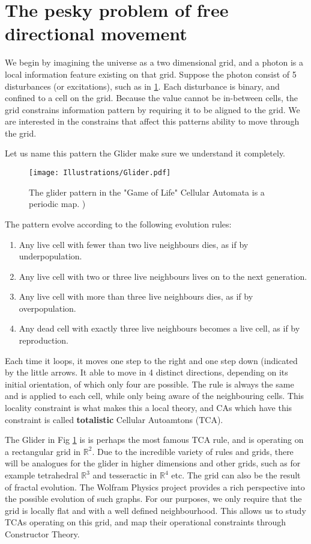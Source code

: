 \documentclass[notitlepage]{article}
\begin{document}
\section{The pesky problem of free directional movement}
We begin by imagining the universe as a two dimensional grid, and a photon is a local information feature existing on that grid. Suppose the photon consist of 5 disturbances (or excitations), such as in \ref{fig:glider}. Each disturbance is binary, and confined to a cell on the grid. Because the value cannot be in-between cells, the grid constrains information pattern by requiring it to be aligned to the grid. We are interested in the constrains that affect this patterns ability to move through the grid. 

Let us name this pattern the Glider make sure we understand it completely.

\begin{figure}[!ht]
  \centering
 \texttt{[image: Illustrations/Glider.pdf]}
  \caption{The glider pattern in the "Game of Life" Cellular Automata is a periodic map.  )  }
      \label{fig:glider}
\end{figure}

The pattern evolve according to the following evolution rules:

\begin{enumerate}
\item Any live cell with fewer than two live neighbours dies, as if by underpopulation.
\item Any live cell with two or three live neighbours lives on to the next generation.
\item Any live cell with more than three live neighbours dies, as if by overpopulation.
\item  Any dead cell with exactly three live neighbours becomes a live cell, as if by reproduction.
\end{enumerate}

Each time it loops, it moves one step to the right and one step down (indicated by the little arrows. It able to move in 4 distinct directions, depending on its initial orientation, of which only four are possible. The rule is always the same and is applied to each cell, while only being aware of the neighbouring cells. This locality constraint is what makes this a local theory, and CAs which have this constraint is called \textbf{totalistic} Cellular Autoamtons (TCA).

The Glider in Fig \ref{fig:glider} is is perhaps the most famous TCA rule, and is operating on a rectangular grid in $\mathbb{R}^2$. Due to the incredible variety of rules and grids, there will be analogues for the glider in higher dimensions and other grids, such as for example tetrahedral $\mathbb{R}^3$ and tesseractic in $\mathbb{R}^4$ etc. The grid can also be the result of fractal evolution. The Wolfram Physics \cite{wolfram2020} project provides a rich perspective into the possible evolution of such graphs. For our purposes, we only require that the grid is locally flat and with a well defined neighbourhood. This allows us to study TCAs operating on this grid, and map their operational constraints through Constructor Theory. 
\end{document}
